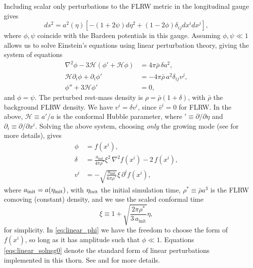Including scalar only perturbations to the FLRW metric in the longitudinal gauge gives
\begin{equation}\label{eq:perturbed_metric}
	ds^2 = a^2(\eta) \left[ - \left(1 + 2\psi\right) d\eta^2 + \left(1 - 2\phi \right) \delta_{ij}dx^i dx^j \right],
\end{equation}
where $\phi,\psi$ coincide with the Bardeen potentials \cite{bardeen1980} in this gauge. Assuming $\phi,\psi\ll1$ allows us to solve Einstein's equations using linear perturbation theory, giving the system of equations \cite{macpherson2017,macpherson2019}
 \begin{subequations} \label{eqs:perturbed_einstein}
	\begin{align}
		\nabla^{2}\phi - 3 \mathcal{H}\left(\phi' + \mathcal{H} \phi\right) &= 4\pi  \bar{\rho}\,\delta a^{2}, \label{eq:einstein_1} \\ 
		\mathcal{H} \partial_{i}\phi + \partial_{i}\phi' &= -4\pi \bar{\rho} \,a^{2} \delta_{ij}v^{j}, \label{eq:einstein_2} \\ 
		\phi'' + 3\mathcal{H}\phi' &=0, \label{eq:einstein_3}
	\end{align}	
\end{subequations}
and $\phi=\psi$. The perturbed rest-mass density is $\rho = \bar{\rho} \left(1 + \delta \right)$, with $\bar{\rho}$ the background FLRW density. We have $v^i = \delta v^i$, since $\bar{v}^i = 0$ for FLRW. In the above, $\mathcal{H}\equiv a'/a$ is the conformal Hubble parameter, where $'\equiv \partial/\partial\eta$ and $\partial_i \equiv \partial/\partial x^i$. Solving the above system, choosing \emph{only} the growing mode (see \cite{macpherson2019} for more details), gives
\begin{subequations} \label{eqs:linear_solnsg0}
    \begin{align}
    	\phi &= f(x^{i}), \label{eq:linear_phi}\\
     	\delta &= \frac{a_{\mathrm{init}}}{4\pi\rho^{*}} \xi^{2}\, \nabla^{2}f(x^{i}) - 2 \,f(x^{i}), \\
     	v^{i} &= -\sqrt{\frac{a_{\mathrm{init}}}{6\pi\rho^{*}}} \xi\, \partial^{i}f(x^{i}),
    \end{align}
\end{subequations}
where $a_{\mathrm{init}} = a(\eta_{\rm init})$, with $\eta_{\rm init}$ the initial simulation time, $\rho^*\equiv \bar{\rho}a^3$ is the FLRW comoving (constant) density, and we use the scaled conformal time
\begin{equation}
	\xi \equiv 1 + \sqrt{\frac{2\pi\rho^{*}}{3\,a_\mathrm{init}}}\eta,
\end{equation}
for simplicity. In \eqref{eq:linear_phi} we have the freedom to choose the form of $f(x^i)$, so long as it has amplitude such that $\phi\ll1$. Equations \eqref{eqs:linear_solnsg0} denote the standard form of linear perturbations implemented in this thorn. See \cite{macpherson2017} and \cite{macpherson2019} for more details. 

